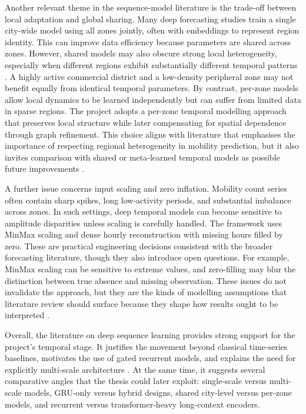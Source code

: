 \documentclass[12pt,a4paper]{report}
\begin{document}
Another relevant theme in the sequence-model literature is the trade-off between local adaptation and global sharing. Many deep forecasting studies train a single city-wide model using all zones jointly, often with embeddings to represent region identity. This can improve data efficiency because parameters are shared across zones. However, shared models may also obscure strong local heterogeneity, especially when different regions exhibit substantially different temporal patterns \cite{lim2021survey,sonnleitner2025heterogeneity}. A highly active commercial district and a low-density peripheral zone may not benefit equally from identical temporal parameters. By contrast, per-zone models allow local dynamics to be learned independently but can suffer from limited data in sparse regions. The project adopts a per-zone temporal modelling approach that preserves local structure while later compensating for spatial dependence through graph refinement. This choice aligns with literature that emphasises the importance of respecting regional heterogeneity in mobility prediction, but it also invites comparison with shared or meta-learned temporal models as possible future improvements \cite{liu2022ridesourcing,zheng2024fairness}.

A further issue concerns input scaling and zero inflation. Mobility count series often contain sharp spikes, long low-activity periods, and substantial imbalance across zones. In such settings, deep temporal models can become sensitive to amplitude disparities unless scaling is carefully handled. The framework uses MinMax scaling and dense hourly reconstruction with missing hours filled by zero. These are practical engineering decisions consistent with the broader forecasting literature, though they also introduce open questions. For example, MinMax scaling can be sensitive to extreme values, and zero-filling may blur the distinction between true absence and missing observation. These issues do not invalidate the approach, but they are the kinds of modelling assumptions that literature review should surface because they shape how results ought to be interpreted \cite{zhuang2022sparse,lim2021survey}.

Overall, the literature on deep sequence learning provides strong support for the project's temporal stage. It justifies the movement beyond classical time-series baselines, motivates the use of gated recurrent models, and explains the need for explicitly multi-scale architecture \cite{lim2021survey,kim2025dltimeseries}. At the same time, it suggests several comparative angles that the thesis could later exploit: single-scale versus multi-scale models, GRU-only versus hybrid designs, shared city-level versus per-zone models, and recurrent versus transformer-heavy long-context encoders.
\end{document}

